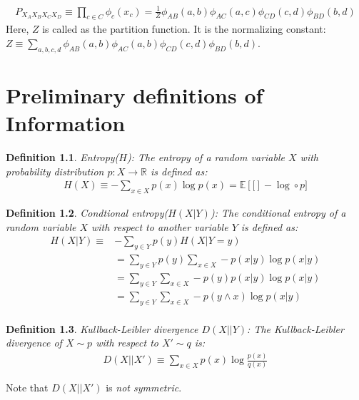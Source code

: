 \documentclass[11pt]{book}
\newcommand{\E}[1]{\ensuremath{\mathbb{E} \left[ #1 \right]}}
\newcommand{\R}{\ensuremath{\mathbb R}}
\renewcommand{\H}{\ensuremath{H}}
\newcommand{\KL}[2]{\ensuremath{D(#1 || #2)}}
\newtheorem{definition}{Definition}
\begin{document}
\begin{align*}
    P_{X_A X_B X_C X_D} \equiv \prod_{c \in C} \phi_c (x_c) = 
    \frac{1}{Z} \phi_{AB}(a, b) \phi_{AC}(a, c) \phi_{CD}(c, d) \phi_{BD}(b, d)
\end{align*}
Here, $Z$ is called as the partition function. It is the normalizing
constant: $Z \equiv \sum_{a, b, c, d} \phi_{AB}(a, b) \phi_{AC}(a, b) \phi_{CD}(c, d) \phi_{BD}(b, d)$.

\chapter{Preliminary definitions of Information}

\begin{definition}
    Entropy(\H): The entropy of a random variable $X$ with probability
    distribution $p: X \rightarrow \R $ is defined as:
    \begin{align*}
        \H(X) \equiv - \sum_{x \in X} p(x) \log p(x) = \E[- \log \circ p]
    \end{align*}
\end{definition}

\begin{definition}
    Condtional entropy($\H(X|Y)$): The conditional entropy of a random 
    variable $X$ with respect to another variable $Y$ is defined as:
    \begin{align*}
        \H(X|Y) \equiv &- \sum_{y \in Y} p(y) \H(X|Y=y) \\
                       &= \sum_{y \in Y} p(y) \sum_{x \in X} - p(x|y) \log p(x | y)\\
                       &= \sum_{y \in Y} \sum_{x \in X} - p(y) p(x|y) \log p(x | y)\\
                       &= \sum_{y \in Y} \sum_{x \in X} - p(y \land x) \log p(x | y)\\
    \end{align*}
\end{definition}

\begin{definition}
    Kullback-Leibler divergence \KL{X}{Y}: The Kullback-Leibler divergence
    of $X \sim p $ with respect to $X' \sim q$ is:
    \begin{align*}
        \KL{X}{X'} \equiv \sum_{x \in X} p(x) \log \frac{p(x)}{q(x)}
    \end{align*}
\end{definition}

Note that \KL{X}{X'} is \emph{not symmetric}.
\end{document}
